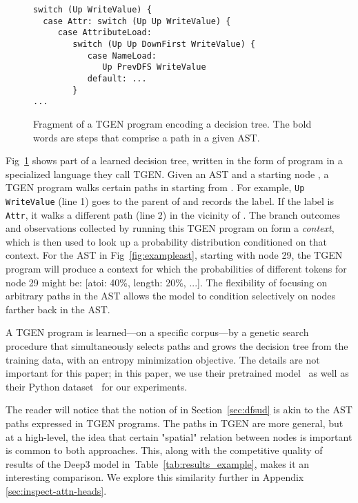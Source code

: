 \documentclass[nonacm, sigconf]{acmart}
\newcommand{\tabref}[1]{Table~\ref{#1}}
\begin{document}
\begin{figure}
\lstset{basicstyle=\footnotesize\ttfamily}
\begin{lstlisting}
switch (Up WriteValue) {
  case Attr: switch (Up Up WriteValue) {
     case AttributeLoad: 
        switch (Up Up DownFirst WriteValue) {
           case NameLoad:
              Up PrevDFS WriteValue
           default: ...
        }
...
\end{lstlisting}
    \caption{Fragment of a TGEN program encoding a decision tree. The bold words are steps that comprise a path in a given AST.}
    \label{fig:deep3}
\end{figure}

Fig~\ref{fig:deep3} shows part of a learned decision tree, written in the form of program in a specialized language they call TGEN.  Given an AST  and a starting node , a TGEN program walks certain paths in  starting from . For example, \texttt{Up WriteValue} (line 1) goes to the parent of  and records the label. If the label is \texttt{Attr}, it walks a different path (line 2) in the vicinity of .  The branch outcomes and observations collected by running this TGEN program on  form a \emph{context}, which is then used to look up a probability distribution conditioned on that context. For the AST in Fig~\ref{fig:exampleast}, starting with node 29, the TGEN program will produce a context for which the probabilities of different tokens for node 29 might be: [atoi: 40\%, length: 20\%, ...].  The flexibility of focusing on arbitrary paths in the AST allows the model to condition selectively on nodes farther back in the AST.

A TGEN program is learned---on a specific corpus---by a genetic search procedure that simultaneously selects paths and grows the decision tree from the training data, with an entropy minimization objective. The details are not important for this paper;
in this paper, we use their pretrained model~\cite{phog} as well as their Python dataset~\cite{py150} for our experiments.


The reader will notice that the notion of  in Section~\ref{sec:dfsud} is  akin to the AST paths expressed in TGEN programs. The paths in TGEN are more general, but at a high-level, the idea that certain "spatial" relation between nodes is important is common to both approaches. This, along with the competitive quality of results of the Deep3 model in~\tabref{tab:results_example}, makes it an interesting comparison. We explore this similarity further in Appendix \ref{sec:inspect-attn-heads}.
\end{document}
